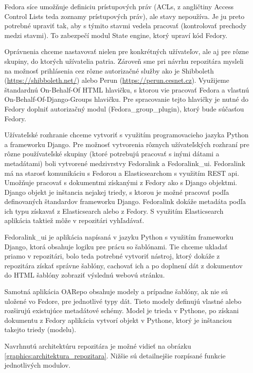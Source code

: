 \documentclass[thesis=M,slovak]{FITthesis}[2013/05/06]
\begin{document}
Fedora síce umožňuje definiciu prístupových práv (ACLs, z angličtiny Access Control Lists teda zoznamy prístupových práv), ale stavy nepoužíva. Je ju preto potrebné upraviť tak, aby s týmito stavmi vedela pracovať (kontrolovať prechody medzi stavmi). To zabezpečí modul State engine, ktorý upraví kód Fedory.

Oprávnenia chceme nastavovať nielen pre konkrétných užívateľov, ale aj pre rôzne skupiny, do ktorých užívatelia patria. Zároveň sme pri návrhu repozitára mysleli na možnosť prihlásenia cez rôzne autorizačné služby ako je Shibboleth (\url{https://shibboleth.net/}) alebo Perun (\url{https://perun.cesnet.cz}). Využijeme štandardnú On-Behalf-Of HTML hlavičku, s ktorou vie pracovať Fedora a vlastnú On-Behalf-Of-Django-Groups hlavičku. Pre spracovanie tejto hlavičky je nutné do Fedory doplniť autorizačný modul (Fedora\_group\_plugin), ktorý bude súčasťou Fedory.

Užívateľské rozhranie chceme vytvoriť s využitím programovacieho jazyka Python a frameworku Django. Pre možnosť vytvorenia rôznych užívateľských rozhraní pre rôzne používateľské skupiny (ktoré potrebujú pracovať s inými dátami a metadátami) boli vytvorené medzivrstvy Fedoralink a Fedoralink\_ui. Fedoralink má na starosť komunikáciu s Fedorou a Elasticsearchom s využitím REST api. Umožňuje pracovať s dokumentmi získanými z Fedory ako s Django objektmi. Django objekt je inštancia nejakej triedy, s ktorou je možné pracovať podľa definovaných štandardov frameworku Django. Fedoralink dokáže metadáta podľa ich typu získavať z Elasticsearch alebo z Fedory. S využitím Elasticsearch aplikácia taktiež môže v repozitári vyhľadávať.

Fedoralink\_ui je aplikácia napísaná v jazyku Python s využitím frameworku Django, ktorá obsahuje logiku pre prácu so šablónami. Tie chceme ukladať priamo v repozitári, bolo teda potrebné vytvoriť nástroj, ktorý dokáže z repozitára získať správne šablóny, cachovať ich a po doplnení dát z dokumentov do HTML šablóny zobraziť výslednú webovú stránku.

Samotná aplikácia OARepo obsahuje modely a prípadne šablóny, ak nie sú uložené vo Fedore, pre jednotlivé typy dát. Tieto modely definujú vlastné alebo rozširujú existujúce metadátové schémy. Model je trieda v Pythone, po získani dokumentu z Fedory aplikácia vytvorí objekt v Pythone, ktorý je inštanciou takejto triedy (modelu).

Navrhnutú architektúru repozitára je možné vidieť na obrázku \ref{graphics:architektura_repozitara}. Nižšie sú detailnejšie rozpísané funkcie jednotlivých modulov.
\end{document}
